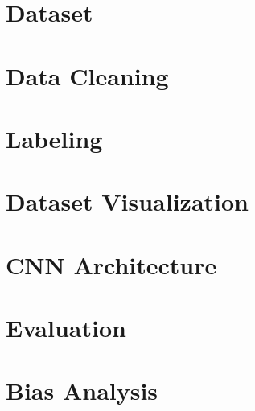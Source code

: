 \documentclass{report}
\begin{document}
  

  \tableofcontents{}
  \printindex{}

  \chapter{Dataset}
  

  \chapter{Data Cleaning}
    

  \chapter{Labeling}
    

  \chapter{Dataset Visualization}
  

  \chapter{CNN Architecture}
    

  \chapter{Evaluation}
    

  \chapter{Bias Analysis}
    


  
  
  \printindex
\end{document}
